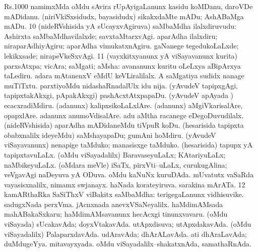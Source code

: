 {{{Rs.1000} namimxMda oMdu sAvira rUpAyigaLanunx kasidu koMDanu, daroVDe
mADidanu.  (niriVkiSxsidudx, bayasidudx)
sikakxdaMte mADu; AshABaMga mADu.
\num{10} (nideRVshisida yA sUcayxvAgiruva) saMbaMdha ilalxdiruvudu:
 Ashirxta saMbaMdhavilalxde; savxtaMtarxvAgi.
 aparAdha ilalxdiru; niraparAdhiyAgiru; aparAdha
vimukatxnAgiru.  gaNanege tegedukoLaLxde;
lekikxsade; nirapeVkeSxvAgi. 
\num{11} (vayxkitxyanunx yA viSayavanunx kurita) parxsAtxpa; vicAra;
saMgati; aMsha:  avananunx kuritu oLeLxya
aBipArxya taLediru.  adara mAtanenxV eMdU
keVLiralilalx.  A saMgatiya sudidx
nanage muTiTxtu.  parxtiyoMdu
nidashaRnadalUlx idu nija.  (yAvudeV tapipxgAgi,
tapipxtakAkxgi, pApakAkxgi) pashAcxtAtxpapaDu. 
 (yAvudeV apAyada \vi) ecacxradiMdiru.  (adanunx) kalipxsikoLaLxlAre. 
 (adanunx) aMgiVkarisalAre, opapxlAre.
 adanunx anumoVdisalAre. 
 adu aMtha
racanege eDegoDuvudilalx. 
 (nideRVshisida) aparAdha mADidaneMdu tiVpuR koDu.
 (hesarisida tapipxta obabxnalilx ideyeMdu)
saMshayapaDu; gumAni hoMdiru. 
 (yAvudeV viSayavanunx) nenapige taMduko;
manasisxge taMduko.  (hesarisida) tapupx yA
tapipxtavuLaLx.  (oMdu viSayadalilx)
BaravaseyuLaLx; KAtariyuLaLx; naMbikeyuLaLx.
 (oMdara meVle) iSaTx, pirxVti--uLaLx,  curukugAlina; veVgavAgi naDeyuva yA ODuva. 
oMdu kaNuNx kuruDAda.
 mUvatutx vaSaRda vayasisxnalilx,
 nimamx swjanayx.  haNada
korateyiruva.  sarakina mArATa.
\num{12} kamARthaRka SaSiThxV viBakitx saMbaMdha:  terigegaLanunx vidhisuvike.  sadugxNada
perxVma.  jAcnxnada
anevxVSaNeyalilx.  haMdimAMsada
mahABakaSxkaru; haMdimAMsavanunx hecAcxgi tinunxvavaru. 
 (oMdu viSayada) sUcakavAda; doyxVtakavAda.
 utApxdisuva; utApxdakavAda. 
(oMdu viSayadalilx) PalaparxdavAda.  udAravAda;
dhArALavAda.  ati dhAraLavAda; duMdugeYya.
 mitavayxyada.
 oMdu viSayadalilx--shakatxnAda, samathaRnAda.
}}
